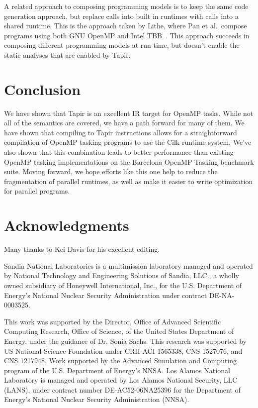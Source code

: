 \documentclass[sigconf]{acmart}
\begin{document}
A related approach to composing programming models is to keep the same code
generation approach, but replace calls into built in runtimes with calls into a
shared runtime. This is the approach taken by Lithe, where Pan et
al.\ compose programs using both GNU OpenMP and Intel TBB~\cite{lithe}. This approach succeeds
in composing different programming models at run-time, but doesn't enable the
static analyses that are enabled by Tapir.

\section{Conclusion} \label{Sec:Conclusion}
We have shown that Tapir is an excellent IR target for OpenMP tasks. While not
all of the semantics are covered, we have a path forward for many of them. We have
shown that compiling to Tapir instructions allows for a straightforward compilation of 
OpenMP tasking programs to use the Cilk runtime system. We've also shown that this
combination leads to better performance than existing OpenMP tasking implementations
on the Barcelona OpenMP Tasking benchmark suite. Moving forward, we hope efforts like
this one help to reduce the fragmentation of parallel runtimes, as well as make
it easier to write optimization for parallel programs. 

\section*{Acknowledgments}

Many thanks to Kei Davis for his excellent editing.

Sandia National Laboratories is a multimission laboratory managed and operated 
by National Technology and Engineering Solutions of Sandia, LLC., a wholly 
owned subsidiary of Honeywell International, Inc., for the U.S. Department of 
Energy's National Nuclear Security Administration under contract DE-NA-0003525.

This work was supported by the Director, Office of Advanced Scientific
Computing Research, Office of Science, of the United States Department of
Energy, under the guidance of Dr. Sonia Sachs. This research was supported by
US National Science Foundation under CRII ACI 1565338, CNS 1527076, and CNS
1217948.  Work supported by the Advanced Simulation and Computing program of
the U.S. Department of Energy's NNSA\@. Los Alamos National Laboratory is
managed and operated by Los Alamos National Security, LLC (LANS), under
contract number DE-AC52-06NA25396 for the Department of Energy's National
Nuclear Security Administration (NNSA).



\end{document}
